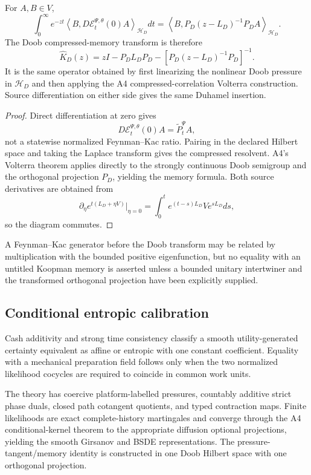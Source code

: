 \begin{theorem}
\label{thm:r6-c2-memory}
For \(A,B\in V\),
\[
\int_0^\infty e^{-zt}
\left\langle B,
D\mathcal E_t^{\Psi,\theta}(0)A
\right\rangle_{\mathcal H_D}dt
=
\left\langle B,
P_D(z-L_D)^{-1}P_DA
\right\rangle_{\mathcal H_D}.
\]
The Doob compressed-memory transform is therefore
\[
\widehat K_D(z)=
zI-P_DL_DP_D-
[P_D(z-L_D)^{-1}P_D]^{-1}.
\]
It is the same operator obtained by first linearizing the nonlinear Doob
pressure in \(\mathcal H_D\) and then applying the A4 compressed-correlation
Volterra construction.  Source differentiation on either side gives the same
Duhamel insertion.
\end{theorem}

\begin{proof}
Direct differentiation at zero gives
\[
D\mathcal E_t^{\Psi,\theta}(0)A
=\widetilde P_t^\Psi A,
\]
not a statewise normalized Feynman--Kac ratio.  Pairing in the declared Hilbert
space and taking the Laplace transform gives the compressed resolvent.  A4's
Volterra theorem applies directly to the strongly continuous Doob semigroup
and the orthogonal projection \(P_D\), yielding the memory formula.  Both
source derivatives are obtained from
\[
\partial_\eta e^{t(L_D+\eta V)}|_{\eta=0}
=\int_0^te^{(t-s)L_D}Ve^{sL_D}ds,
\]
so the diagram commutes.
\end{proof}

A Feynman--Kac generator before the Doob transform may be related by
multiplication with the bounded positive eigenfunction, but no equality with
an untitled Koopman memory is asserted unless a bounded unitary intertwiner and
the transformed orthogonal projection have been explicitly supplied.

\subsection{Conditional entropic calibration}

Cash additivity and strong time consistency classify a smooth
utility-generated certainty equivalent as affine or entropic with one constant
coefficient.  Equality with a mechanical preparation field follows only when
the two normalized likelihood cocycles are required to coincide in common
work units.

\begin{theorem}
\label{thm:r6-c2-main}
The theory has coercive platform-labelled pressures, countably additive strict
phase duals, closed path cotangent quotients, and typed contraction maps.
Finite likelihoods are exact complete-history martingales and converge through
the A4 conditional-kernel theorem to the appropriate diffusion optional
projections, yielding the smooth Girsanov and BSDE representations.  The
pressure-tangent/memory identity is constructed in one Doob Hilbert space with
one orthogonal projection.
\end{theorem}


